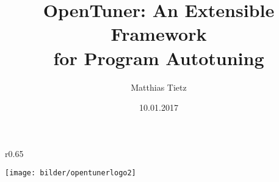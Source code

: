 
\usepackage[utf8]{inputenc}
\usepackage{babel}
\usepackage{floatflt}
\usepackage{float}
\usepackage{graphics}
\usepackage{graphicx}
\usepackage{listings}
\usepackage{color}
\usepackage{url}
\usepackage{hyperref}
\usepackage{wrapfig}


%
%


\title{OpenTuner: An Extensible Framework \\for Program Autotuning}
\author{Matthias Tietz}
\date{10.01.2017}





    \tucthreeheadlines

    \begingroup
      \begin{frame}
        \titlepage
    \end{frame}
    \endgroup

    \begingroup
    \begin{frame}
        \begin{wrapfigure}{r}{0.65\textwidth}
          \begin{center}
            \texttt{[image: bilder/opentunerlogo2]}
          \end{center}
        \end{wrapfigure}
        \normalsize \tableofcontents  
    \end{frame}
    \endgroup

